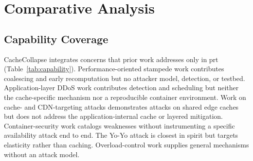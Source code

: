 \section{Comparative Analysis}
\label{sec:comparative}

\subsection{Capability Coverage}
CacheCollapse integrates concerns that prior work addresses only in prt
(Table~\ref{tab:capability}). Performance-oriented stampede work
\cite{vattani2015,nishtala2013} contributes coalescing and early recomputation but no
attacker model, detection, or testbed. Application-layer DDoS work
\cite{praseed2019,xie2009,ranjan2009} contributes detection and scheduling but neither
the cache-specific mechanism nor a reproducible container environment. Work on
cache- and CDN-targeting attacks \cite{nguyen2019,guo2020,triukose2009} demonstrates
attacks on shared edge caches but does not address the application-internal cache or
layered mitigation. Container-security work \cite{combe2016,sultan2019} catalogs
weaknesses without instrumenting a specific availability attack end to end. The Yo-Yo
attack \cite{sides2016,bremlerbarr2017} is closest in spirit but targets elasticity
rather than caching. Overload-control work \cite{welsh2001,welsh2003} supplies general
mechanisms without an attack model.

